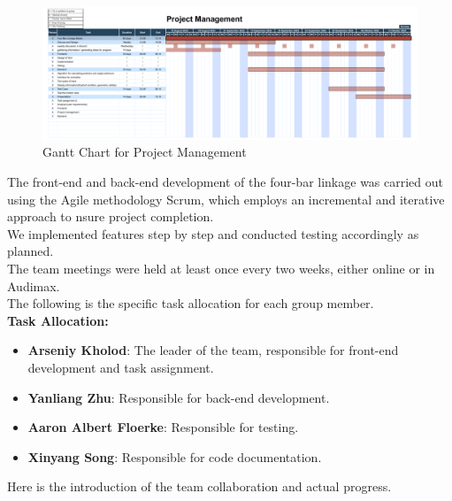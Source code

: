 \documentclass{article}
\begin{document}
\begin{figure}[h]
	\centering
	\includegraphics[width=\textwidth]{./figures/project_management_gantt_chart.pdf}
	\caption{Gantt Chart for Project Management}
	\label{fig:project_management_gantt_chart}
\end{figure}

The front-end and back-end development of the four-bar linkage was carried out using the Agile methodology Scrum, which employs an incremental and iterative approach to nsure project completion.\\
We implemented features step by step and conducted testing accordingly as planned.\\
The team meetings were held at least once every two weeks, either online or in Audimax.\\
The following is the specific task allocation for each group member.\\

\textbf{Task Allocation:}
\begin{itemize}
    \item \textbf{Arseniy Kholod}: The leader of the team, responsible for front-end development and task assignment.
    \item \textbf{Yanliang Zhu}: Responsible for back-end development.
    \item \textbf{Aaron Albert Floerke}: Responsible for testing.
    \item \textbf{Xinyang Song}: Responsible for code documentation.
\end{itemize}

Here is the introduction of the team collaboration and actual progress.
\end{document}
